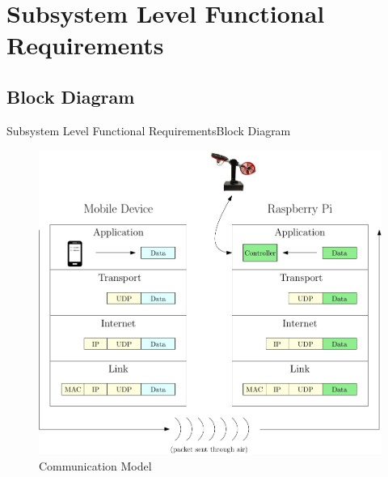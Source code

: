 \documentclass{beamer}
\begin{document}


\section{Subsystem Level Functional Requirements}



\subsection{Block Diagram}

\begin{frame}{Subsystem Level Functional Requirements}{Block Diagram}

\begin{figure}
  \centering
  \includegraphics[scale=0.31]{figs/ipe/TCPModel}
  \caption{Communication Model}
  \label{fig:TCPModel}
\end{figure}

\end{frame}
\end{document}
